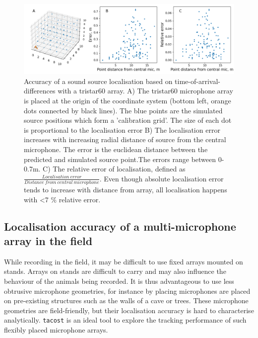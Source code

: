 \documentclass[
]{book}
\begin{document}
\begin{figure}
\includegraphics[width=1.0\columnwidth]{original_papers/tacost/data_for_figures/analysis/fig1_points_and_error.png}
\centering
\caption{Accuracy of a sound source localisation based on time-of-arrival-differences with a tristar60 array. A) The tristar60 microphone array is placed at the origin of the coordinate system (bottom left, orange dots connected by black lines). The blue points are the simulated source positions which form a 'calibration grid'. The size of each dot is proportional to the localisation error B) The localisation error increases with increasing radial distance of source from the central microphone. The error is the euclidean distance between the predicted and simulated source point.The errors range between 0-0.7m. C) The relative error of localisation, defined as $\frac{Localisation \:error}{Distance \:from \:central \:microphone}$. Even though absolute localisation error tends to increase with distance from array, all localisation happens with <7 $\%$ relative error.}
\label{tacostfig1}
\end{figure}

\hypertarget{localisation-accuracy-of-a-multi-microphone-array-in-the-field}{%
\subsection{Localisation accuracy of a multi-microphone array in the field}\label{localisation-accuracy-of-a-multi-microphone-array-in-the-field}}

While recording in the field, it may be difficult to use fixed arrays mounted on stands. Arrays on stands are difficult to carry and may also influence the behaviour of the animals being recorded. It is thus advantageous to use less obtrusive microphone geometries, for instance by placing microphones are placed on pre-existing structures such as the walls of a cave or trees. These microphone geometries are field-friendly, but their localisation accuracy is hard to characterise analytically. \texttt{tacost} is an ideal tool to explore the tracking performance of such flexibly placed microphone arrays.
\end{document}

